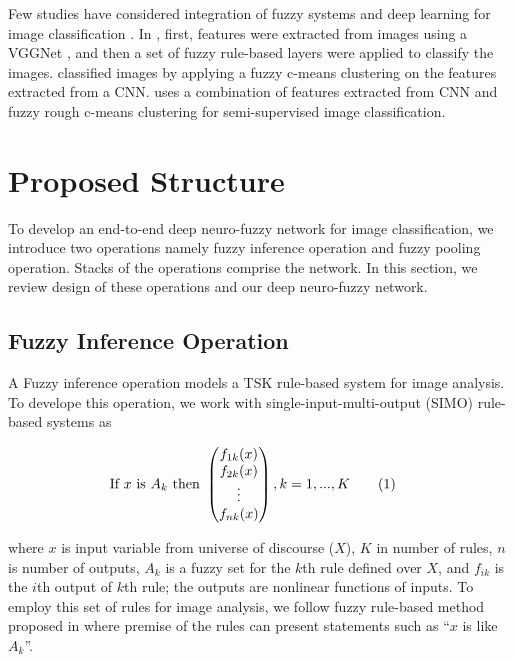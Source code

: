 \documentclass{article}
\newcommand\numberthis{\addtocounter{equation}{1}\tag{\theequation}}
\begin{document}
Few studies have considered integration of fuzzy systems and deep learning for image classification \citep{gu2018semi,yeganejou2018classification,riaz2019semi}. In \citep{gu2018semi}, first, features were extracted from images using a VGGNet \citep{simonyan2014very}, and then a set of fuzzy rule-based layers \citep{angelov2010simple} were applied to classify the images. \citep{yeganejou2018classification} classified images by applying a fuzzy c-means clustering on the features extracted from a CNN. \citep{riaz2019semi} uses a combination of features extracted from CNN and fuzzy rough c-means clustering for semi-supervised image classification.

\section{Proposed Structure}

To develop an end-to-end deep neuro-fuzzy network for image classification, we introduce two operations namely fuzzy inference operation and fuzzy pooling operation. Stacks of the operations comprise the network. In this section, we review design of these operations and our deep neuro-fuzzy network.

\subsection{Fuzzy Inference Operation}

A Fuzzy inference operation models a TSK rule-based system for image analysis. To develope this operation, we work with single-input-multi-output (SIMO) rule-based systems as

\begin{align*}
\textrm{If } x \textrm{ is } A_k & \textrm{ then } \begin{pmatrix}f_{1k}(x) \\  f_{2k}(x) \\ \vdots \\  f_{nk}(x)\end{pmatrix},    k=1,...,K \numberthis  \label{eq:fuzzy-conv}
\end{align*}

where $x$ is input variable from universe of discourse ($X$), $K$ in number of rules, $n$ is number of outputs, $A_k$ is a fuzzy set for the $k$th rule defined over $X$, and $f_{ik}$ is the $i$th output of $k$th rule; the outputs are nonlinear functions of inputs. To employ this set of rules for image analysis, we follow fuzzy rule-based method proposed in \citep{angelov2010simple} where premise of the rules can present statements such as ``$x$ is like $A_k$''. 
\end{document}
